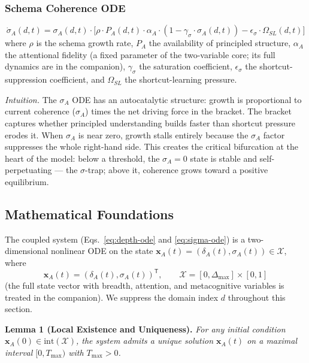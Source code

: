 \documentclass{article}
\theoremstyle{definition}
\begin{document}
\subsubsection{Schema Coherence ODE}
\begin{equation}\label{eq:sigma-ode}
\dot{\sigma}_A(d,t) = \sigma_A(d,t) \cdot \bigl[ \rho \cdot P_A(d,t) \cdot \alpha_A \cdot (1 - \gamma_{\sigma} \cdot \sigma_A(d,t)) - \epsilon_{\sigma} \cdot \Omega_{SL}(d,t) \bigr]
\end{equation}
where $\rho$ is the schema growth rate, $P_A$ the availability of
principled structure, $\alpha_A$ the attentional fidelity (a fixed
parameter of the two-variable core; its full dynamics are in the
companion), $\gamma_\sigma$ the saturation coefficient, $\epsilon_\sigma$
the shortcut-suppression coefficient, and $\Omega_{SL}$ the
shortcut-learning pressure.

\noindent\textit{Intuition.} The $\sigma_A$ ODE has an autocatalytic
structure: growth is proportional to current coherence ($\sigma_A$)
times the net driving force in the bracket. The bracket captures whether
principled understanding builds faster than shortcut pressure erodes it.
When $\sigma_A$ is near zero, growth stalls entirely because the
$\sigma_A$ factor suppresses the whole right-hand side. This creates the
critical bifurcation at the heart of the model: below a threshold, the
$\sigma_A = 0$ state is stable and self-perpetuating --- the
$\sigma$-trap; above it, coherence grows toward a positive equilibrium.

\subsection{Mathematical Foundations}\label{sec:math-foundations}

The coupled system (Eqs.~\eqref{eq:depth-ode} and \eqref{eq:sigma-ode})
is a two-dimensional nonlinear ODE on the state
$\mathbf{x}_A(t) = (\delta_A(t), \sigma_A(t)) \in \mathcal{X}$, where
\begin{equation}\label{eq:state-vector}
\mathbf{x}_A(t) = (\delta_A(t), \sigma_A(t))^{\mathsf{T}},
\qquad
\mathcal{X} = [0, \Delta_{\max}] \times [0, 1]
\end{equation}
(the full state vector with breadth, attention, and metacognitive
variables is treated in the companion). We suppress the domain index $d$
throughout this section.

\textbf{Lemma 1 (Local Existence and Uniqueness).} %
\emph{For any initial condition $\mathbf{x}_A(0) \in \text{int}(\mathcal{X})$,
the system admits a unique solution $\mathbf{x}_A(t)$ on a maximal
interval $[0, T_{\max})$ with $T_{\max} > 0$.}
\end{document}
